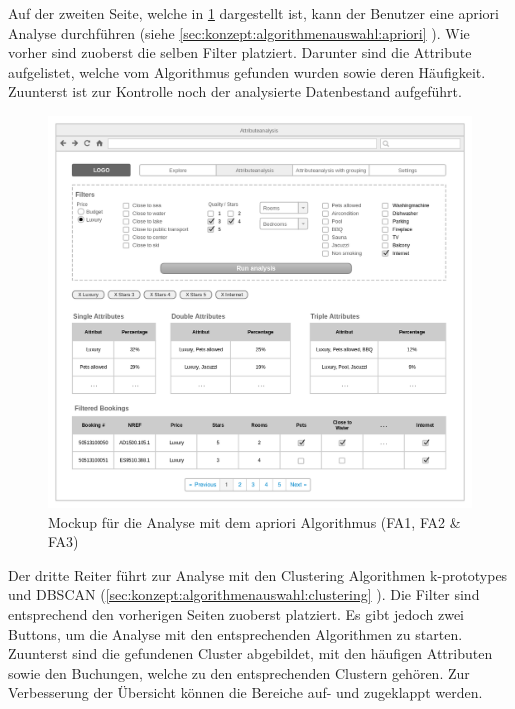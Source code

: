 Auf der zweiten Seite, welche in \cref{fig:konzept:mockups:apriori} dargestellt ist, kann der Benutzer eine apriori Analyse durchführen (siehe \cref{sec:konzept:algorithmenauswahl:apriori} ). Wie vorher sind zuoberst die selben Filter platziert. Darunter sind die Attribute aufgelistet, welche vom Algorithmus gefunden wurden sowie deren Häufigkeit. Zuunterst ist zur Kontrolle noch der analysierte Datenbestand aufgeführt.
\begin{figure}[H]
	\RawFloats
	\centering
	\includegraphics[width=1\textwidth]{images/wireframe-apriori}
	\caption{Mockup für die Analyse mit dem apriori Algorithmus (FA1, FA2 \& FA3)}
	\label{fig:konzept:mockups:apriori}
\end{figure}

Der dritte Reiter führt zur Analyse mit den Clustering Algorithmen k-prototypes und DBSCAN (\cref{sec:konzept:algorithmenauswahl:clustering} ). Die Filter sind entsprechend den vorherigen Seiten zuoberst platziert. Es gibt jedoch zwei Buttons, um die Analyse mit den entsprechenden Algorithmen zu starten. Zuunterst sind die gefundenen Cluster abgebildet, mit den häufigen Attributen sowie den Buchungen, welche zu den entsprechenden Clustern gehören. Zur Verbesserung der Übersicht können die Bereiche auf- und zugeklappt werden.

